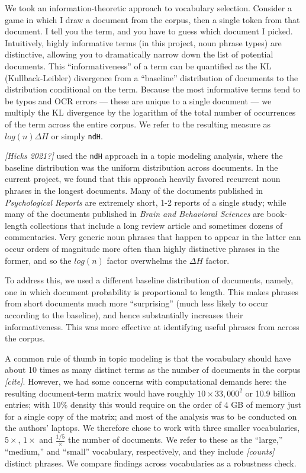 \documentclass[12pt]{article}
\begin{document}
We took an information-theoretic approach to vocabulary selection.
Consider a game in which I draw a document from the corpus, then a
single token from that document. I tell you the term, and you have to
guess which document I picked. Intuitively, highly informative terms (in
this project, noun phrase types) are distinctive, allowing you to
dramatically narrow down the list of potential documents. This
``informativeness'' of a term can be quantified as the KL
(Kullback-Leibler) divergence from a ``baseline'' distribution of
documents to the distribution conditional on the term. Because the most
informative terms tend to be typos and OCR errors --- these are unique
to a single document --- we multiply the KL divergence by the logarithm
of the total number of occurrences of the term across the entire corpus.
We refer to the resulting measure as \(log(n) \Delta H\) or simply
\texttt{ndH}.

\emph{{[}Hicks 2021?{]}} used the \texttt{ndH} approach in a topic
modeling analysis, where the baseline distribution was the uniform
distribution across documents. In the current project, we found that
this approach heavily favored recurrent noun phrases in the longest
documents. Many of the documents published in \emph{Psychological
Reports} are extremely short, 1-2 reports of a single study; while many
of the documents published in \emph{Brain and Behavioral Sciences} are
book-length collections that include a long review article and sometimes
dozens of commentaries. Very generic noun phrases that happen to appear
in the latter can occur orders of magnitude more often than highly
distinctive phrases in the former, and so the \(log(n)\) factor
overwhelms the \(\Delta H\) factor.

To address this, we used a different baseline distribution of documents,
namely, one in which document probability is proportional to length.
This makes phrases from short documents much more ``surprising'' (much
less likely to occur according to the baseline), and hence substantially
increases their informativeness. This was more effective at identifying
useful phrases from across the corpus.

A common rule of thumb in topic modeling is that the vocabulary should
have about 10 times as many distinct terms as the number of documents in
the corpus \emph{{[}cite{]}}. However, we had some concerns with
computational demands here: the resulting document-term matrix would
have roughly \(10 \times 33,000^2\) or 10.9 billion entries; with 10\%
density this would require on the order of 4 GB of memory just for a
single copy of the matrix; and most of the analysis was to be conducted
on the authors' laptops. We therefore chose to work with three smaller
vocabularies, \(5 \times\), \(1 \times\) and \(\frac{1/5} \times\) the
number of documents. We refer to these as the ``large,'' ``medium,'' and
``small'' vocabulary, respectively, and they include \emph{{[}counts{]}}
distinct phrases. We compare findings across vocabularies as a
robustness check.
\end{document}
